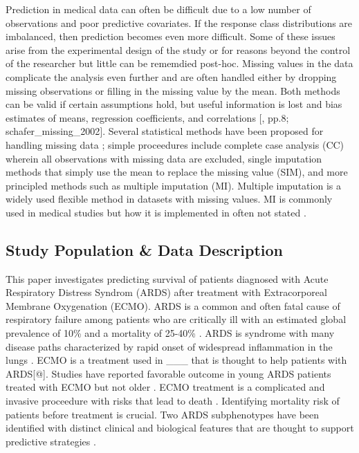 \documentclass[12pt,]{article}
\begin{document}
Prediction in medical data can often be difficult due to a low number of
observations and poor predictive covariates. If the response class
distributions are imbalanced, then prediction becomes even more
difficult. Some of these issues arise from the experimental design of
the study or for reasons beyond the control of the researcher but little
can be rememdied post-hoc. Missing values in the data complicate the
analysis even further and are often handled either by dropping missing
observations or filling in the missing value by the mean. Both methods
can be valid if certain assumptions hold, but useful information is lost
and bias estimates of means, regression coefficients, and correlations
{[}\textcite{van_buuren_flexible_2012}, pp.8; schafer\_missing\_2002{]}.
Several statistical methods have been proposed for handling missing data
\autocite{schafer_missing_2002}; simple proceedures include complete
case analysis (CC) wherein all observations with missing data are
excluded, single imputation methods that simply use the mean to replace
the missing value (SIM), and more principled methods such as multiple
imputation (MI). Multiple imputation is a widely used flexible method in
datasets with missing values. MI is commonly used in medical studies
\autocites{powney_review_2014}{karahalios_review_2012}{wood_are_2004}
but how it is implemented in often not stated
\autocites{mackinnon_use_2010}{hayati_rezvan_rise_2015}.

\subsection{Study Population \& Data
Description}\label{study-population-data-description}

This paper investigates predicting survival of patients diagnosed with
Acute Respiratory Distress Syndrom (ARDS) after treatment with
Extracorporeal Membrane Oxygenation (ECMO). ARDS is a common and often
fatal cause of respiratory failure among patients who are critically ill
with an estimated global prevalence of 10\% and a mortality of 25-40\%
\autocites{bellani_epidemiology_2016}{rubenfeld_epidemiology_2007}{fan_acute_2018}.
ARDS is syndrome with many disease paths characterized by rapid onset of
widespread inflammation in the lungs \autocite{fan_acute_2018}. ECMO is
a treatment used in \_\_\_ that is thought to help patients with
ARDS{[}@{]}. Studies have reported favorable outcome in young ARDS
patients treated with ECMO but not older \autocite{Sahetya01052018}.
ECMO treatment is a complicated and invasive proceedure with risks that
lead to death \autocite{paolone_extracorporeal_2017}. Identifying
mortality risk of patients before treatment is crucial. Two ARDS
subphenotypes have been identified with distinct clinical and biological
features that are thought to support predictive strategies
\autocites{calfee_acute_2018}{sinha_latent_2018}.
\end{document}
